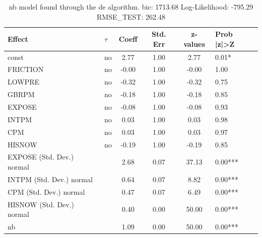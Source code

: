 \begin{table}
	\caption{nb model found through the de algorithm. bic: 1713.68 Log-Likelihood: -795.29 RMSE_TEST: 262.48}
	\begin{center}
		\begin{tabular}{|l|l|c|c|c|l|}
			\hline
			Effect & $\tau$ & Coeff & Std. Err & z-values & Prob |z|>Z \\
			\hline
			const & no & 2.77 & 1.00 & 2.77 & 0.01* \\
			\hline
			FRICTION & no & -0.00 & 1.00 & -0.00 & 1.00 \\
			\hline
			LOWPRE & no & -0.32 & 1.00 & -0.32 & 0.75 \\
			\hline
			GBRPM & no & -0.18 & 1.00 & -0.18 & 0.85 \\
			\hline
			EXPOSE & no & -0.08 & 1.00 & -0.08 & 0.93 \\
			\hline
			INTPM & no & 0.03 & 1.00 & 0.03 & 0.98 \\
			\hline
			CPM & no & 0.03 & 1.00 & 0.03 & 0.97 \\
			\hline
			HISNOW & no & -0.19 & 1.00 & -0.19 & 0.85 \\
			\hline
			EXPOSE (Std. Dev.) normal &  & 2.68 & 0.07 & 37.13 & 0.00*** \\
			\hline
			INTPM (Std. Dev.) normal &  & 0.64 & 0.07 & 8.82 & 0.00*** \\
			\hline
			CPM (Std. Dev.) normal &  & 0.47 & 0.07 & 6.49 & 0.00*** \\
			\hline
			HISNOW (Std. Dev.) normal &  & 0.40 & 0.00 & 50.00 & 0.00*** \\
			\hline
			nb &  & 1.09 & 0.00 & 50.00 & 0.00*** \\
			\hline
		\end{tabular}
	\end{center}
\end{table}
